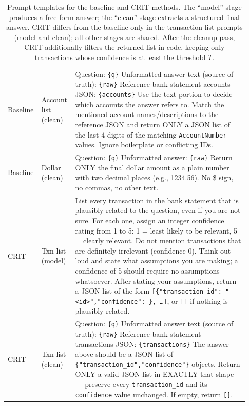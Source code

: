 \documentclass[11pt]{article}
\begin{document}
\begin{table}[h]
\begin{tabular}{p{0.10\linewidth} p{0.13\linewidth} p{0.70\linewidth}}
Baseline & Account list (clean) &
Question: \texttt{\{q\}}\newline
Unformatted answer text (source of truth): \texttt{\{raw\}}\newline
Reference bank statement accounts JSON: \texttt{\{accounts\}}\newline
Use the text portion to decide which accounts the answer refers to. Match the mentioned account names/descriptions to the reference JSON and return ONLY a JSON list of the last 4 digits of the matching \texttt{AccountNumber} values. Ignore boilerplate or conflicting IDs. \\
Baseline & Dollar (clean) &
Question: \texttt{\{q\}}\newline
Unformatted answer: \texttt{\{raw\}}\newline
Return ONLY the final dollar amount as a plain number with two decimal places (e.g., 1234.56). No \$ sign, no commas, no other text. \\
\midrule
CRIT & Txn list (model) &
List every transaction in the bank statement that is plausibly related to the question, even if you are not sure. For each one, assign an integer confidence rating from 1 to 5: 1 = least likely to be relevant, 5 = clearly relevant. Do not mention transactions that are definitely irrelevant (confidence 0). Think out loud and state what assumptions you are making; a confidence of 5 should require no assumptions whatsoever. After stating your assumptions, return a JSON list of the form
\texttt{[\{"transaction\_id":\,"<id>","confidence":\,<1--5>\},\,\ldots]}, or \texttt{[]} if nothing is plausibly related. \\
CRIT & Txn list (clean) &
Question: \texttt{\{q\}}\newline
Unformatted answer text (source of truth): \texttt{\{raw\}}\newline
Reference bank statement transactions JSON: \texttt{\{transactions\}}\newline
The answer above should be a JSON list of
\texttt{\{"transaction\_id","confidence"\}} objects. Return ONLY a valid JSON list in EXACTLY that shape --- preserve every \texttt{transaction\_id} and its \texttt{confidence} value unchanged. If empty, return \texttt{[]}. \\
\bottomrule
\end{tabular}
\caption{Prompt templates for the baseline and CRIT methods. The ``model''
stage produces a free-form answer; the ``clean'' stage extracts a structured
final answer. CRIT differs from the baseline only in the transaction-list
prompts (model and clean); all other stages are shared. After the cleanup
pass, CRIT additionally filters the returned list in code, keeping only
transactions whose confidence is at least the threshold $T$.}
\label{tab:prompts}
\end{table}
\end{document}
